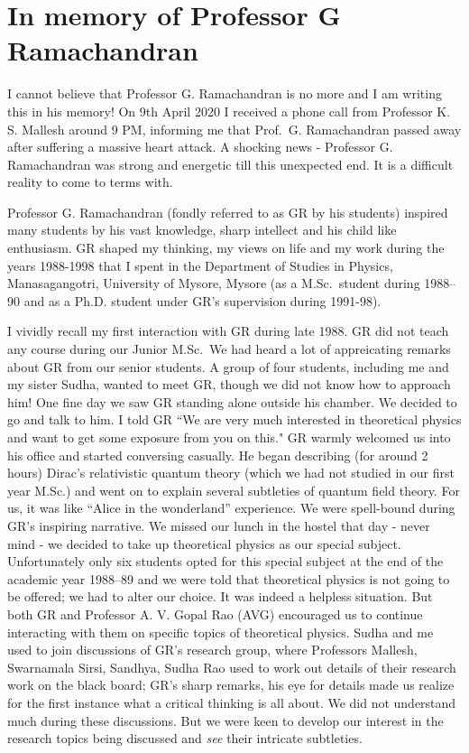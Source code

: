 \chapter[In memory of Professor G Ramachandran]{In memory of Professor G Ramachandran}\label{chap28}


\renewcommand{\thefootnote}{\arabic{footnote}}

I cannot believe that Professor G. Ramachandran is no more and I am writing this in his memory! On 9th April 2020 I received a phone call from Professor K. S. Mallesh around 9 PM, informing me that Prof.\ G. Ramachandran passed away after suffering a massive heart attack. A shocking news - Professor G. Ramachandran was strong and energetic till this unexpected end. It is a difficult reality to come to terms with.

Professor G. Ramachandran (fondly referred to as GR by his students) inspired many students by his vast knowledge, sharp intellect and his child like enthusiasm. GR shaped my thinking, my views on life and my work during the years 1988-1998 that I spent in the Department of Studies in Physics, Manasagangotri, University of Mysore, Mysore (as a M.Sc.\ student during 1988--90 and as a Ph.D. student under GR’s supervision during 1991-98).

I vividly recall my first interaction with GR during late 1988. GR did not teach any course during our Junior M.Sc.\ We had heard a lot of appreicating remarks about GR from our senior students. A group of four students, including me and my sister Sudha, wanted to meet GR, though we did not know how to approach him! One fine day we saw GR standing alone outside his chamber. We decided to go and talk to him. I told GR ``We are very much interested in theoretical physics and want to get some exposure from you on this." GR warmly welcomed us into his office and started conversing casually. He began describing (for around 2 hours) Dirac’s relativistic quantum theory (which we had not studied in our first year M.Sc.) and went on to explain several subtleties of quantum field theory. For us, it was like “Alice in the wonderland” experience. We were spell-bound during GR's inspiring narrative. We missed our lunch in the hostel that day - never mind - we decided to take up theoretical physics as our special subject. Unfortunately only six students opted for this special subject at the end of the academic year 1988--89 and we were told that theoretical physics is not going to be offered; we had to alter our choice. It was indeed a helpless situation. But both GR and Professor A. V. Gopal Rao (AVG) encouraged us to continue interacting with them on specific topics of theoretical physics. Sudha and me used to join discussions of GR's research group, where Professors Mallesh, Swarnamala Sirsi, Sandhya, Sudha Rao used to work out details of their research work on the black board; GR's sharp remarks, his eye for details made us realize for the first instance what a critical thinking is all about. We did not understand much during these discussions. But we were keen to develop our interest in the research topics being discussed and \textit{see} their intricate subtleties.

